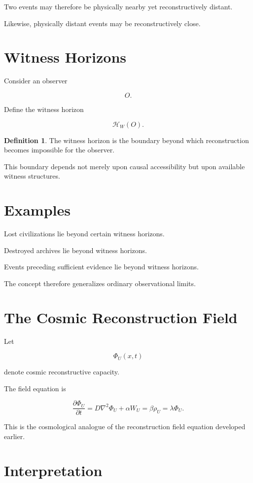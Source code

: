 \documentclass[12pt,oneside]{book}
\theoremstyle{plain} \newtheorem{theorem}{Theorem}[chapter] \newtheorem{lemma}[theorem]{Lemma} \newtheorem{proposition}[theorem]{Proposition} \newtheorem{corollary}[theorem]{Corollary}
\theoremstyle{definition} \newtheorem{definition}[theorem]{Definition} \newtheorem{axiom}[theorem]{Axiom} \newtheorem{construction}[theorem]{Construction}
\theoremstyle{remark} \newtheorem{remark}[theorem]{Remark} \newtheorem{example}[theorem]{Example}
\begin{document}
Two events may therefore be physically nearby yet reconstructively distant.

Likewise, physically distant events may be reconstructively close.

\section{Witness Horizons}

Consider an observer

\[
O.
\]

Define the witness horizon

\[
\mathcal H_W(O).
\]

\begin{definition}

The witness horizon is the boundary beyond which reconstruction becomes impossible for the observer.

\end{definition}

This boundary depends not merely upon causal accessibility but upon available witness structures.

\section{Examples}

Lost civilizations lie beyond certain witness horizons.

Destroyed archives lie beyond witness horizons.

Events preceding sufficient evidence lie beyond witness horizons.

The concept therefore generalizes ordinary observational limits.

\section{The Cosmic Reconstruction Field}

Let

\[
\Phi_U(x,t)
\]

denote cosmic reconstructive capacity.

The field equation is

\[
\frac{\partial\Phi_U}{\partial t}
=
D\nabla^2\Phi_U
+
\alpha W_U
=
\beta\rho_U
=
\lambda\Phi_U.
\]

This is the cosmological analogue of the reconstruction field equation developed earlier.

\section{Interpretation}
\end{document}
